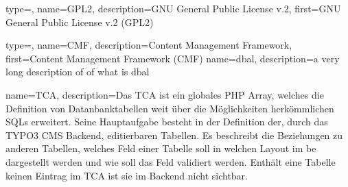 {
	type=\acronymtype,
	name={GPL2},
	description={GNU General Public License v.2},
	first={GNU General Public License v.2 (GPL2)}
}

{
	type=\acronymtype,
	name={CMF},
	description={Content Management Framework},
	first={Content Management Framework (CMF)}
}
{
	name={dbal},
	description={a very long description of of what is dbal}
}

{
	name={TCA},
	description={Das TCA ist ein globales PHP Array, welches die Definition von Datanbanktabellen weit über die Möglichkeiten herkömmlichen SQLs erweitert. Seine Hauptaufgabe besteht in der Definition der, durch das TYPO3 CMS Backend, editierbaren Tabellen. Es beschreibt die Beziehungen zu anderen Tabellen, welches Feld einer Tabelle soll in welchen Layout im \gls{be} dargestellt werden und wie soll das Feld validiert werden. Enthält eine Tabelle keinen Eintrag im TCA ist sie im Backend nicht sichtbar.}
}
